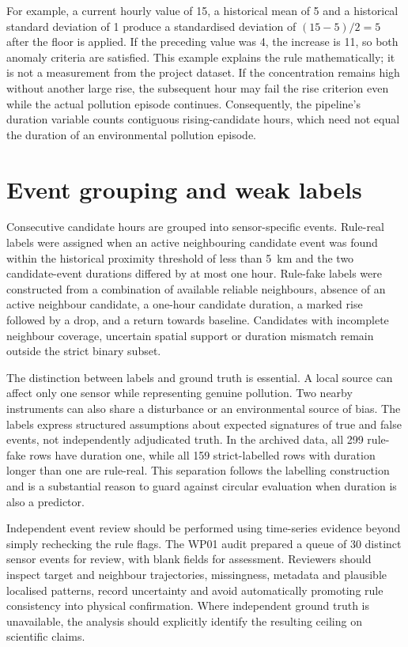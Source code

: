 \documentclass[12pt,a4paper,oneside]{report}
\begin{document}
For example, a current hourly value of 15, a historical mean of 5 and a historical standard deviation of 1 produce a standardised deviation of $(15-5)/2=5$ after the floor is applied. If the preceding value was 4, the increase is 11, so both anomaly criteria are satisfied. This example explains the rule mathematically; it is not a measurement from the project dataset. If the concentration remains high without another large rise, the subsequent hour may fail the rise criterion even while the actual pollution episode continues. Consequently, the pipeline's duration variable counts contiguous rising-candidate hours, which need not equal the duration of an environmental pollution episode.

\section{Event grouping and weak labels}
Consecutive candidate hours are grouped into sensor-specific events. Rule-real labels were assigned when an active neighbouring candidate event was found within the historical proximity threshold of less than 5~km and the two candidate-event durations differed by at most one hour. Rule-fake labels were constructed from a combination of available reliable neighbours, absence of an active neighbour candidate, a one-hour candidate duration, a marked rise followed by a drop, and a return towards baseline. Candidates with incomplete neighbour coverage, uncertain spatial support or duration mismatch remain outside the strict binary subset.

The distinction between labels and ground truth is essential. A local source can affect only one sensor while representing genuine pollution. Two nearby instruments can also share a disturbance or an environmental source of bias. The labels express structured assumptions about expected signatures of true and false events, not independently adjudicated truth. In the archived data, all 299 rule-fake rows have duration one, while all 159 strict-labelled rows with duration longer than one are rule-real. This separation follows the labelling construction and is a substantial reason to guard against circular evaluation when duration is also a predictor.

Independent event review should be performed using time-series evidence beyond simply rechecking the rule flags. The WP01 audit prepared a queue of 30 distinct sensor events for review, with blank fields for assessment. Reviewers should inspect target and neighbour trajectories, missingness, metadata and plausible localised patterns, record uncertainty and avoid automatically promoting rule consistency into physical confirmation. Where independent ground truth is unavailable, the analysis should explicitly identify the resulting ceiling on scientific claims.
\end{document}
